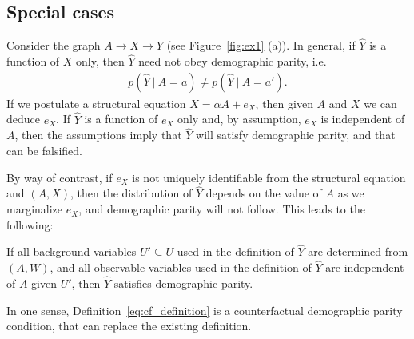 \subsection{Special cases}
%
Consider the graph $A \rightarrow X \rightarrow Y$ (see
Figure~\ref{fig:ex1} (a)). In general, if $\hat Y$ is a function of
$X$ only, then $\hat Y$ need not obey demographic parity, i.e.
\begin{align}
  p(\hat Y\ |\ A = a) \neq p(\hat Y\ |\ A = a').\nonumber
\end{align}
If we postulate a
structural equation $X = \alpha A + e_X$, then given $A$ and $X$ we
can deduce $e_X$. If $\hat Y$ is a function of $e_X$ only and, by
assumption, $e_X$ is independent of $A$, then the assumptions imply
that $\hat Y$ will satisfy demographic parity, and that can be
falsified.

By way of contrast, if $e_X$ is not uniquely identifiable from the structural equation and $(A, X)$, then the distribution of $\hat Y$ depends on the value of $A$ as we marginalize $e_X$, and demographic parity will not follow. This leads to the following:

\begin{lem}
If all background variables $U' \subseteq U$ used in the definition of $\hat Y$ are determined from $(A, W)$, and all observable variables used in the definition of $\hat Y$ are independent of $A$ given $U'$, then $\hat Y$ satisfies demographic parity. %
\end{lem}
  
In one sense, Definition~\ref{eq:cf_definition} is a counterfactual
demographic parity condition, that can replace the
existing definition.

